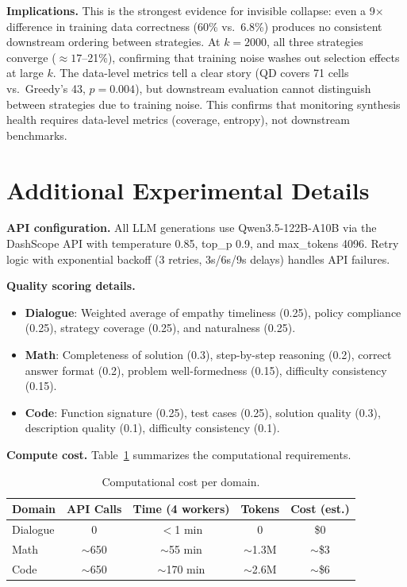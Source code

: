 \documentclass{article}
\begin{document}
\begin{enumerate}[nosep]
\textbf{Implications.}
This is the strongest evidence for invisible collapse: even a 9$\times$ difference in training data correctness (60\% vs.\ 6.8\%) produces no consistent downstream ordering between strategies.
At $k{=}2000$, all three strategies converge (${\approx}17$--21\%), confirming that training noise washes out selection effects at large $k$.
The data-level metrics tell a clear story (QD covers 71 cells vs.\ Greedy's 43, $p{=}0.004$), but downstream evaluation cannot distinguish between strategies due to training noise.
This confirms that monitoring synthesis health requires data-level metrics (coverage, entropy), not downstream benchmarks.

\section{Additional Experimental Details}
\label{sec:app_exp}

\textbf{API configuration.}
All LLM generations use Qwen3.5-122B-A10B via the DashScope API with temperature 0.85, top\_p 0.9, and max\_tokens 4096.
Retry logic with exponential backoff (3 retries, 3s/6s/9s delays) handles API failures.

\textbf{Quality scoring details.}
\begin{itemize}[nosep]
  \item \textbf{Dialogue}: Weighted average of empathy timeliness (0.25), policy compliance (0.25), strategy coverage (0.25), and naturalness (0.25).
  \item \textbf{Math}: Completeness of solution (0.3), step-by-step reasoning (0.2), correct answer format (0.2), problem well-formedness (0.15), difficulty consistency (0.15).
  \item \textbf{Code}: Function signature (0.25), test cases (0.25), solution quality (0.3), description quality (0.1), difficulty consistency (0.1).
\end{itemize}

\textbf{Compute cost.}
Table~\ref{tab:compute} summarizes the computational requirements.

\begin{table}[h]
\centering
\caption{Computational cost per domain.}
\label{tab:compute}
\begin{tabular}{lcccc}
\toprule
\textbf{Domain} & \textbf{API Calls} & \textbf{Time (4 workers)} & \textbf{Tokens} & \textbf{Cost (est.)} \\
\midrule
Dialogue & 0 & $<$1 min & 0 & \$0 \\
Math & $\sim$650 & $\sim$55 min & $\sim$1.3M & $\sim$\$3 \\
Code & $\sim$650 & $\sim$170 min & $\sim$2.6M & $\sim$\$6 \\
\bottomrule
\end{tabular}
\end{table}


\end{enumerate}
\end{document}
